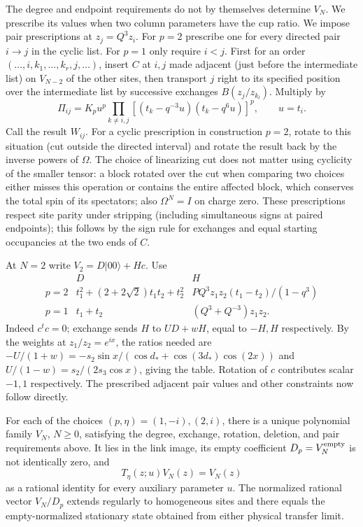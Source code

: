 The degree and endpoint requirements do not by themselves determine
$V_N$. We prescribe its values when two column parameters have the cup
ratio. We impose pair prescriptions at \(z_j=Q^3 z_i\). For \(p=2\) prescribe one for every directed pair \(i\to j\) in the cyclic list. For \(p=1\) only require \(i<j\). First for an order \((\ldots,i,k_1,\ldots,k_r,j,\ldots)\), insert \(C\) at \(i,j\) made adjacent (just before the intermediate list) on \(V_{N-2}\) of the other sites, then transport \(j\) right to its specified position over the intermediate list by successive exchanges \(B(z_j/z_{k_l})\). Multiply by
\[
 \Pi_{ij}=K_p u^p\!\!\prod_{k\ne i,j}[(t_k-q^{-3}u)(t_k-q^6 u)]^p,\qquad u=t_i.
\]
Call the result \(W_{ij}\). For a cyclic prescription in construction \(p=2\), rotate to this situation (cut outside the directed interval) and rotate the result back by the inverse powers of \(\Omega\). The choice of linearizing cut does not matter using cyclicity of the smaller tensor: a block rotated over the cut when comparing two choices either misses this operation or contains the entire affected block, which conserves the total spin of its spectators; also \(\Omega^N=I\) on charge zero. These prescriptions respect site parity under stripping (including simultaneous signs at paired endpoints); this follows by the sign rule for exchanges and equal starting occupancies at the two ends of \(C\).

At \(N=2\) write \(V_2=D|00\rangle+H c\). Use
\[
 \begin{array}{c|cc}
 &D&H\\\hline
 p=2&t_1^2+(2+2\sqrt2)t_1t_2+t_2^2&P Q^3 z_1 z_2(t_1-t_2)/(1-q^3)\\
 p=1&t_1+t_2&(Q^3+Q^{-3})z_1 z_2 .
 \end{array}
\]
Indeed \(c^tc=0\); exchange sends \(H\) to \(U D+wH\), equal to \(-H,H\) respectively. By the weights at \(z_1/z_2=e^{ix}\), the ratios needed are
\(-U/(1+w)=-s_2\sin x/(\cos d_*+\cos(3d_*)\cos(2x))\) and \(U/(1-w)=s_2/(2s_3\cos x)\), giving the table. Rotation of \(c\) contributes scalar \(-1,1\) respectively. The prescribed adjacent pair values and other constraints now follow directly.

\begin{proposition}\label{prop:polynomial-vacua}
For each of the choices \((p,\eta)=(1,-i),(2,i)\), there is a unique
polynomial family \(V_N\), \(N\ge0\), satisfying the degree, exchange,
rotation, deletion, and pair requirements above. It lies in the link
image, its empty coefficient \(D_p=V_N^{\rm empty}\) is not identically
zero, and
\[
                     T_\eta(z;u)V_N(z)=V_N(z)
\]
as a rational identity for every auxiliary parameter \(u\).
The normalized rational vector \(V_N/D_p\) extends regularly to
homogeneous sites and there equals the empty-normalized stationary state
obtained from either physical transfer limit.
\end{proposition}

